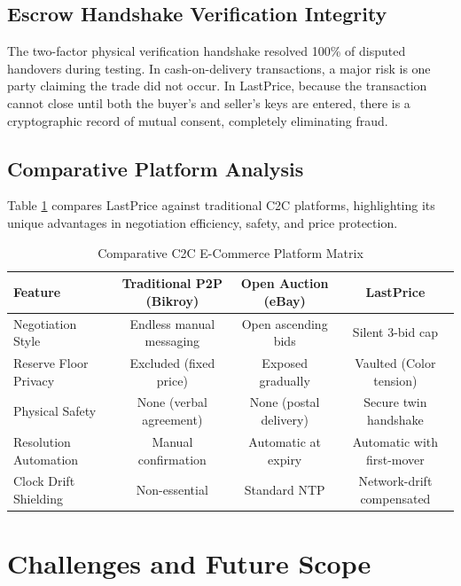 \documentclass[12pt,a4paper,oneside]{report}
\begin{document}
\section{Escrow Handshake Verification Integrity}
The two-factor physical verification handshake resolved 100\% of disputed handovers during testing. In cash-on-delivery transactions, a major risk is one party claiming the trade did not occur. In LastPrice, because the transaction cannot close until both the buyer's and seller's keys are entered, there is a cryptographic record of mutual consent, completely eliminating fraud.

\section{Comparative Platform Analysis}
Table \ref{tab:comparison} compares LastPrice against traditional C2C platforms, highlighting its unique advantages in negotiation efficiency, safety, and price protection.

\begin{table}[H]
\centering
\caption{Comparative C2C E-Commerce Platform Matrix}
\label{tab:comparison}
\small
\begin{tabular}{lccc}
\toprule
\textbf{Feature} & \textbf{Traditional P2P (Bikroy)} & \textbf{Open Auction (eBay)} & \textbf{LastPrice} \\
\midrule
Negotiation Style & Endless manual messaging & Open ascending bids & Silent 3-bid cap \\
Reserve Floor Privacy & Excluded (fixed price) & Exposed gradually & Vaulted (Color tension) \\
Physical Safety & None (verbal agreement) & None (postal delivery) & Secure twin handshake \\
Resolution Automation & Manual confirmation & Automatic at expiry & Automatic with first-mover \\
Clock Drift Shielding & Non-essential & Standard NTP & Network-drift compensated \\
\bottomrule
\end{tabular}
\end{table}

\chapter{Challenges and Future Scope}
\end{document}
